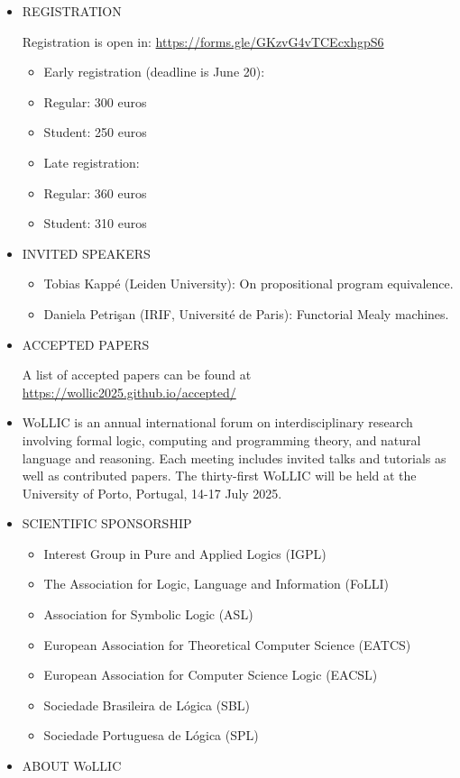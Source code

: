 \documentclass[prodmode,acmtecs]{acmsmall} %
\begin{document}
\begin{itemize}\item  REGISTRATION 
 
  Registration is open in: \href{https://forms.gle/GKzvG4vTCEcxhgpS6}{https://forms.gle/GKzvG4vTCEcxhgpS6} 
 
\begin{itemize}\item  Early registration (deadline is June 20):
\item  Regular: 300 euros
\item  Student: 250 euros
\item   Late registration:
\item  Regular: 360 euros
\item  Student: 310 euros
\end{itemize} 
\item  INVITED SPEAKERS 
 
\begin{itemize}\item  Tobias Kappé (Leiden University): On propositional program equivalence.
\item  Daniela Petrişan (IRIF, Université de Paris): Functorial Mealy machines.
\end{itemize} 
\item  ACCEPTED PAPERS 
 
  A list of accepted papers can be found at \href{https://wollic2025.github.io/accepted/}{https://wollic2025.github.io/accepted/} 
 
\item  WoLLIC is an annual international forum on interdisciplinary research involving formal logic, computing and programming theory, and natural language and reasoning. Each meeting includes invited talks and tutorials as well as contributed papers. The thirty-first WoLLIC will be held at the University of Porto, Portugal, 14-17 July 2025.  
 
\item  SCIENTIFIC SPONSORSHIP 
 
\begin{itemize}\item  Interest Group in Pure and Applied Logics (IGPL)
\item  The Association for Logic, Language and Information (FoLLI)
\item  Association for Symbolic Logic (ASL)
\item  European Association for Theoretical Computer Science (EATCS)
\item  European Association for Computer Science Logic (EACSL)
\item  Sociedade Brasileira de Lógica (SBL)
\item  Sociedade Portuguesa de Lógica (SPL)
\end{itemize} 
\item  ABOUT WoLLIC 
 

\end{itemize}
\end{document}
